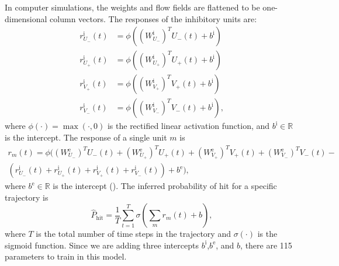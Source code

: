 \documentclass[pdftex,9pt,lineno]{elife}
\let\hat\widehat
\begin{document}
In computer simulations, the weights and flow fields are flattened to be one-dimensional column vectors. The responses of the inhibitory units are:
\begin{align*}
r^{\text{i}}_{U_{-}}(t) &= \phi \left( (W^{\text{i}}_{U_{-}})^{T}U_{-}(t)+b^{\text{i}} \right) \nonumber \\
r^{\text{i}}_{U_{+}}(t) &= \phi \left( (W^{\text{i}}_{U_{+}})^{T}U_{+}(t)+b^{\text{i}} \right) \nonumber \\
r^{\text{i}}_{V_{+}}(t) &= \phi \left( (W^{\text{i}}_{V_{+}})^{T}V_{+}(t)+b^{\text{i}} \right) \nonumber \\
r^{\text{i}}_{V_{-}}(t) &= \phi \left( (W^{\text{i}}_{V_{-}})^{T}V_{-}(t)+b^{\text{i}} \right),
\end{align*}
where $\phi(\cdot) = \max(\cdot,0)$ is the rectified linear activation function, and $b^{\text{i}} \in \mathbb{R}$ is the intercept.
The response of a single unit $m$ is
\begin{multline}\label{eq:LPLC2_response}
r_{m}(t) = \phi \Bigg( (W^{\text{e}}_{U_{-}})^{T}U_{-}(t)+(W^{\text{e}}_{U_{+}})^{T}U_{+}(t)+(W^{\text{e}}_{V_{+}})^{T}V_{+}(t)+(W^{\text{e}}_{V_{-}})^{T}V_{-}(t)- \\
\left(r^{\text{i}}_{U_{-}}(t)+r^{\text{i}}_{U_{+}}(t)+r^{\text{i}}_{V_{+}}(t)+r^{\text{i}}_{V_{-}}(t)\right)+b^{\text{e}} \Bigg),
\end{multline}
where $b^{\text{e}} \in \mathbb{R}$ is the intercept ().
The inferred probability of hit for a specific trajectory is
\begin{equation}
\hat{P}_{\text{hit}} =\frac{1}{T}\sum_{t=1}^{T} \sigma \left( \sum_{m}r_{m}(t)+b \right),
\label{eq:prob_model}
\end{equation}
where $T$ is the total number of time steps in the trajectory and $\sigma(\cdot)$ is the sigmoid function. Since we are adding three intercepts $b^{\text{i}}$,$b^{\text{e}}$, and $b$, there are 115 parameters to train in this model.


\end{document}
